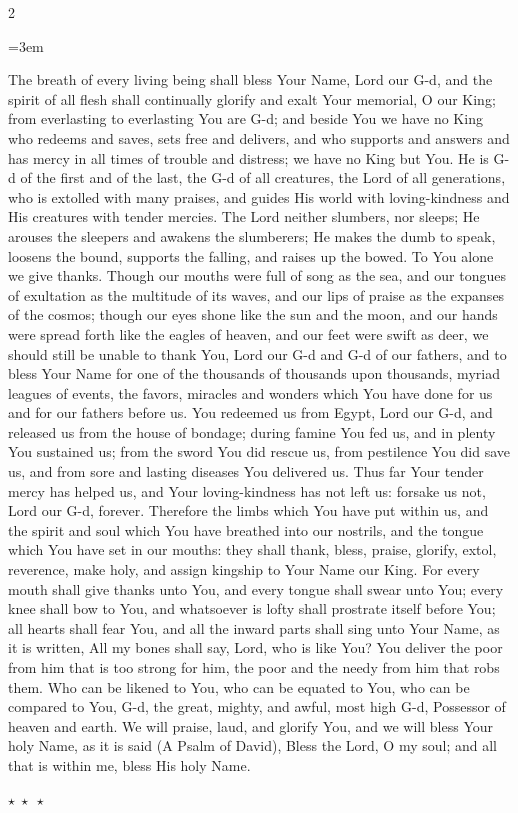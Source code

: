 \documentclass[11pt, openany]{book}
\newenvironment{bilingual}{%
  \par\vspace{4pt}%
  \begin{paracol}{2}%
}{%
  \end{paracol}%
  \par\vspace{2pt}%
}
\newenvironment{englishcol}{%
  \switchcolumn[0]%
  \begingroup
  \setstretch{1.4}%
  \emergencystretch=3em
  \tolerance=9999
  \normalsize
  \rightskip=0.12in\relax
}{%
  \endgroup
}
\newcommand{\parasep}{%
  \par\vspace{3pt}
  \begin{center}
    \textcolor{sedergold!50}{\small$\star\;\star\;\star$}
  \end{center}
  \par\vspace{3pt}
}
\begin{document}
\begin{bilingual}
\begin{englishcol}
The breath of every living being shall bless Your Name, Lord our G-d, and the spirit of all flesh shall continually glorify and exalt Your memorial, O our King; from everlasting to everlasting You are G-d; and beside You we have no King who redeems and saves, sets free and delivers, and who supports and answers and has mercy in all times of trouble and distress; we have no King but You. He is G-d of the first and of the last, the G-d of all creatures, the Lord of all generations, who is extolled with many praises, and guides His world with loving-kindness and His creatures with tender mercies. The Lord neither slumbers, nor sleeps; He arouses the sleepers and awakens the slumberers; He makes the dumb to speak, loosens the bound, supports the falling, and raises up the bowed. To You alone we give thanks. Though our mouths were full of song as the sea, and our tongues of exultation as the multitude of its waves, and our lips of praise as the expanses of the cosmos; though our eyes shone like the sun and the moon, and our hands were spread forth like the eagles of heaven, and our feet were swift as deer, we should still be unable to thank You, Lord our G-d and G-d of our fathers, and to bless Your Name for one of the thousands of thousands upon thousands, myriad leagues of events, the favors, miracles and wonders which You have done for us and for our fathers before us. You redeemed us from Egypt, Lord our G-d, and released us from the house of bondage; during famine You fed us, and in plenty You sustained us; from the sword You did rescue us, from pestilence You did save us, and from sore and lasting diseases You delivered us. Thus far Your tender mercy has helped us, and Your loving-kindness has not left us: forsake us not, Lord our G-d, forever. Therefore the limbs which You have put within us, and the spirit and soul which You have breathed into our nostrils, and the tongue which You have set in our mouths: they shall thank, bless, praise, glorify, extol, reverence, make holy, and assign kingship to Your Name our King. For every mouth shall give thanks unto You, and every tongue shall swear unto You; every knee shall bow to You, and whatsoever is lofty shall prostrate itself before You; all hearts shall fear You, and all the inward parts shall sing unto Your Name, as it is written, All my bones shall say, Lord, who is like You? You deliver the poor from him that is too strong for him, the poor and the needy from him that robs them. Who can be likened to You, who can be equated to You, who can be compared to You, G-d, the great, mighty, and awful, most high G-d, Possessor of heaven and earth. We will praise, laud, and glorify You, and we will bless Your holy Name, as it is said (A Psalm of David), Bless the Lord, O my soul; and all that is within me, bless His holy Name.
\end{englishcol}
\end{bilingual}
\parasep
\end{document}
